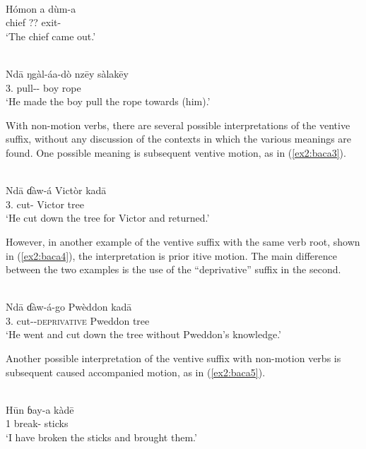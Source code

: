\ea\label{ex2:baca1}
 \\
\gll Hómon a dùm-a \\
chief ?? exit-	\\
\glt `The chief came out.'

\ex\label{ex2:baca2}
 \\
\gll  Ndā ŋgàl-áa-dò nzēy sàlakēy \\
3. pull-- boy rope	\\
\glt `He made the boy pull the rope towards (him).'
\z

With non-motion verbs, there are several possible interpretations of the ventive suffix, without any discussion of the contexts in which the various meanings are found. One possible meaning is subsequent ventive motion, as in (\ref{ex2:baca3}). 

\ea\label{ex2:baca3}
 \\
\gll Ndā ɗàw-á Victòr kadā	\\
3. cut- Victor tree		\\
\glt `He cut down the tree for Victor and returned.'
\z 

However, in another example of the ventive suffix with the same verb root, shown in (\ref{ex2:baca4}), the interpretation is prior itive motion. The main difference between the two examples is the use of the ``deprivative'' suffix in the second.

\ea\label{ex2:baca4}
 \\
\gll Ndā ɗàw-á-go Pwèddon kadā	\\
3. cut--\textsc{deprivative} Pweddon tree		\\
\glt `He went and cut down the tree without Pweddon's knowledge.'
\z 

Another possible interpretation of the ventive suffix with non-motion verbs is subsequent caused accompanied motion, as in (\ref{ex2:baca5}). 

\ea\label{ex2:baca5}
 \\
\gll Hūn ɓay-a kàdē	\\
1 break- sticks		\\
\glt `I have broken the sticks and brought them.'
\z 

